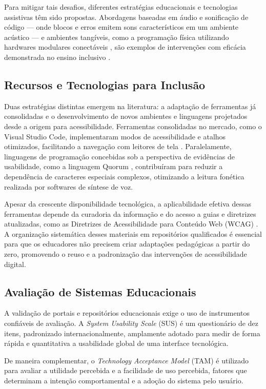 \documentclass[12pt]{article}
\begin{document}
Para mitigar tais desafios, diferentes estratégias educacionais e tecnologias assistivas têm sido propostas. Abordagens baseadas em áudio e sonificação de código --- onde blocos e erros emitem sons característicos em um ambiente acústico --- e ambientes tangíveis, como a programação física utilizando hardwares modulares conectáveis \cite{codejumper2019}, são exemplos de intervenções com eficácia demonstrada no ensino inclusivo \cite{stefik2013empirical}.

\subsection{Recursos e Tecnologias para Inclusão}
Duas estratégias distintas emergem na literatura: a adaptação de ferramentas já consolidadas e o desenvolvimento de novos ambientes e linguagens projetados desde a origem para acessibilidade. Ferramentas consolidadas no mercado, como o Visual Studio Code, implementaram modos de acessibilidade e atalhos otimizados, facilitando a navegação com leitores de tela \cite{seo2023coding, vscode_accessibility}. Paralelamente, linguagens de programação concebidas sob a perspectiva de evidências de usabilidade, como a linguagem Quorum \cite{stefik2019quorum}, contribuíram para reduzir a dependência de caracteres especiais complexos, otimizando a leitura fonética realizada por softwares de síntese de voz.

Apesar da crescente disponibilidade tecnológica, a aplicabilidade efetiva dessas ferramentas depende da curadoria da informação e do acesso a guias e diretrizes atualizadas, como as Diretrizes de Acessibilidade para Conteúdo Web (WCAG) \cite{wcag21}. A organização sistemática desses materiais em repositórios qualificados é essencial para que os educadores não precisem criar adaptações pedagógicas a partir do zero, promovendo o reuso e a padronização das intervenções de acessibilidade digital.

\subsection{Avaliação de Sistemas Educacionais}
A validação de portais e repositórios educacionais exige o uso de instrumentos confiáveis de avaliação. A \textit{System Usability Scale} (SUS) \cite{brooke1996sus} é um questionário de dez itens, padronizado internacionalmente, amplamente adotado para medir de forma rápida e quantitativa a usabilidade global de uma interface tecnológica.

De maneira complementar, o \textit{Technology Acceptance Model} (TAM) \cite{davis1989tam} é utilizado para avaliar a utilidade percebida e a facilidade de uso percebida, fatores que determinam a intenção comportamental e a adoção do sistema pelo usuário.
\end{document}

